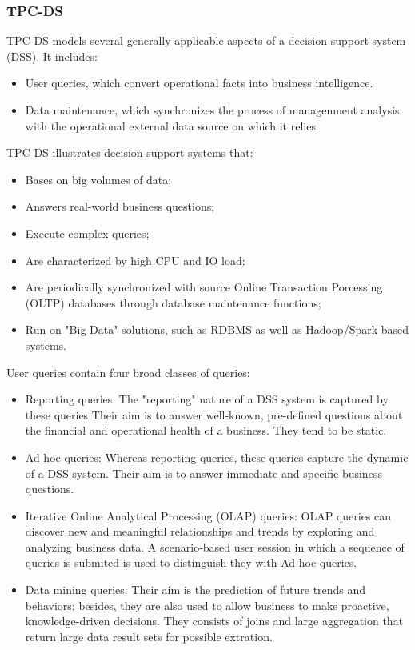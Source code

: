 \subsubsection{TPC-DS}

TPC-DS \cite{TPC} models several generally applicable aspects of a decision support system (DSS). It includes: 

\begin{itemize}
	\item User queries, which convert operational facts into business intelligence.
	\item Data maintenance, which synchronizes the process of managenment analysis with the 
	operational external data source on which it relies.
\end{itemize}

TPC-DS illustrates decision support systems that:

\begin{itemize}
	\item Bases on big volumes of data;
	\item Answers real-world business questions;
	\item Execute complex queries;
	\item Are characterized by high CPU and IO load;
	\item Are periodically synchronized with source Online Transaction Porcessing (OLTP)
	 databases through database maintenance functions;
	\item Run on "Big Data" solutions, such as RDBMS as well as Hadoop/Spark based systems.
\end{itemize}

User queries contain four broad classes of queries:

\begin{itemize}
	\item Reporting queries: The "reporting" nature of a DSS system is captured by these queries
	Their aim is to answer well-known, pre-defined questions about the financial and operational 
	health of a business. They tend to be static.
	\item Ad hoc queries: Whereas reporting queries, these queries capture the dynamic of a DSS system.
	Their aim is to answer immediate and specific business questions.
	\item Iterative Online Analytical Processing (OLAP) queries: OLAP queries can discover new and meaningful 
	relationships and trends by exploring and analyzing business data. A scenario-based user session in which a
	sequence of queries is submited is used to distinguish they with Ad hoc queries.
	\item Data mining queries: Their aim is the prediction of future trends and behaviors; besides, they are
	also used to allow business to make proactive, knowledge-driven decisions. They consists of joins and large
	aggregation that return large data result sets for possible extration.
\end{itemize}

